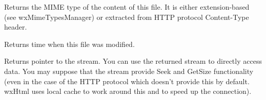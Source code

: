 Returns the MIME type of the content of this file. It is either
extension-based (see wxMimeTypesManager) or extracted from
HTTP protocol Content-Type header.

\label{wxfsfilegetmodificationtime}


Returns time when this file was modified.

\label{wxfsfilegetstream}


Returns pointer to the stream. You can use the returned
stream to directly access data. You may suppose
that the stream provide Seek and GetSize functionality
(even in the case of the HTTP protocol which doesn't provide
this by default. wxHtml uses local cache to work around
this and to speed up the connection).

